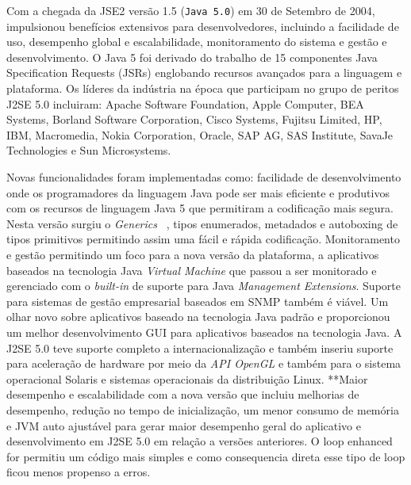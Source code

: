 Com a chegada da \acs{JSE2} vers\~{a}o 1.5 (\texttt{Java 5.0}) em 30 de Setembro de 2004, impulsionou benef\'{i}cios extensivos para desenvolvedores, incluindo a facilidade de uso, desempenho global e escalabilidade, monitoramento do sistema e gest\~{a}o e desenvolvimento. O Java 5 foi derivado do trabalho de 15 componentes Java Specification Requests (JSRs) englobando recursos avançados para a linguagem e plataforma. Os l\'{i}deres da ind\'{u}stria na \'{e}poca que participam no grupo de peritos J2SE 5.0 incluiram: Apache Software Foundation, Apple Computer, BEA Systems, Borland Software Corporation, Cisco Systems, Fujitsu Limited, HP, IBM, Macromedia, Nokia Corporation, Oracle, SAP AG, SAS Institute, SavaJe Technologies e Sun Microsystems.

Novas funcionalidades foram implementadas como: facilidade de desenvolvimento onde os programadores da linguagem Java pode ser mais eficiente e produtivos com os recursos de linguagem Java 5 que permitiram a codifica\c{c}\~{a}o mais segura. Nesta vers\~{a}o surgiu o {\it Generics} ~\cite{OracleGenerics, bracha1998gj}, tipos enumerados, metadados e autoboxing de tipos primitivos permitindo assim uma f\'{a}cil e r\'{a}pida codificaç\~{a}o. Monitoramento e gest\~{a}o permitindo um foco para a nova vers\~{a}o da plataforma, a aplicativos baseados na tecnologia Java {\it Virtual Machine} que passou a ser monitorado e gerenciado com o {\it built-in} de suporte para Java {\it Management Extensions}. Suporte para sistemas de gest\~{a}o empresarial baseados em SNMP tamb\'{e}m \'{e} vi\'{a}vel. Um olhar novo sobre aplicativos baseado na tecnologia Java padr\~{a}o e proporcionou um melhor desenvolvimento GUI para aplicativos baseados na tecnologia Java. A J2SE 5.0 teve suporte completo a internacionalizaç\~{a}o e tamb\'{e}m inseriu suporte para aceleraç\~{a}o de hardware por meio da {\it API OpenGL } e tamb\'{e}m para o sistema operacional Solaris e sistemas operacionais da distribuiç\~{a}o Linux. **Maior desempenho e escalabilidade com a nova vers\~{a}o que incluiu melhorias de desempenho, reduç\~{a}o no tempo de inicializa\c{c}\~{a}o, um menor consumo de mem\'{o}ria e JVM auto ajust\'{a}vel para gerar maior desempenho geral do aplicativo e desenvolvimento em J2SE 5.0 em relaç\~{a}o a vers\~{o}es anteriores.
O loop enhanced for permitiu um c\'{o}digo mais simples e como consequencia direta esse tipo de loop ficou menos propenso a erros.



